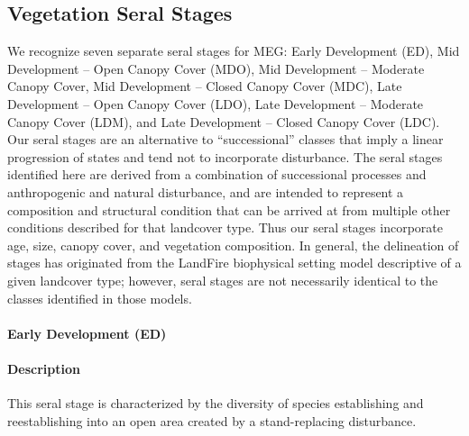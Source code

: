 \subsection*{Vegetation Seral Stages}
We recognize seven separate seral stages for MEG: Early Development (ED), Mid Development – Open Canopy Cover (MDO), Mid Development – Moderate Canopy Cover, Mid Development – Closed Canopy Cover (MDC), Late Development – Open Canopy Cover (LDO), Late Development – Moderate Canopy Cover (LDM), and Late Development – Closed Canopy Cover (LDC). Our seral stages are an alternative to ``successional'' classes that imply a linear progression of states and tend not to incorporate disturbance. The seral stages identified here are derived from a combination of successional processes and anthropogenic and natural disturbance, and are intended to represent a composition and structural condition that can be arrived at from multiple other conditions described for that landcover type. Thus our seral stages incorporate age, size, canopy cover, and vegetation composition. In general, the delineation of stages has originated from the LandFire biophysical setting model descriptive of a given landcover type; however, seral stages are not necessarily identical to the classes identified in those models.

\paragraph{Early Development (ED)}

\paragraph{Description} This seral stage is characterized by the diversity of species establishing and reestablishing into an open area created by a stand-replacing disturbance. 

